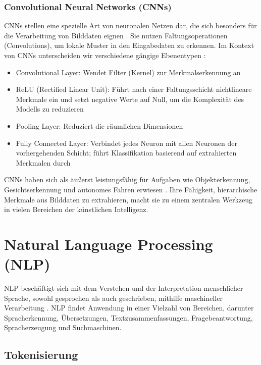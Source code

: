 \subsubsection{Convolutional Neural Networks (CNNs)}
\label{subsubsec:cnn}

\glspl{CNN} stellen eine spezielle Art von neuronalen Netzen dar, die sich besonders für die Verarbeitung von Bilddaten eignen \cite{RebalaGopinath2019AItM}. Sie nutzen Faltungsoperationen (Convolutions), um lokale Muster in den Eingabedaten zu erkennen. Im Kontext von \glspl{CNN} unterscheiden wir verschiedene gängige Ebenentypen \cite{RebalaGopinath2019AItM}:

\begin{itemize}
	\item Convolutional Layer: Wendet Filter (Kernel) zur Merkmalserkennung an
	\item ReLU (Rectified Linear Unit): Führt nach einer Faltungsschicht nichtlineare Merkmale ein und setzt negative Werte auf Null, um die Komplexität des Modells zu reduzieren
	\item Pooling Layer: Reduziert die räumlichen Dimensionen
	\item Fully Connected Layer: Verbindet jedes Neuron mit allen Neuronen der vorhergehenden Schicht; führt Klassifikation basierend auf extrahierten Merkmalen durch
\end{itemize}

CNNs haben sich als äußerst leistungsfähig für Aufgaben wie Objekterkennung, Gesichtserkennung und autonomes Fahren erwiesen \cite{RebalaGopinath2019AItM}. Ihre Fähigkeit, hierarchische Merkmale aus Bilddaten zu extrahieren, macht sie zu einem zentralen Werkzeug in vielen Bereichen der künstlichen Intelligenz.

\section{Natural Language Processing (NLP)}
\label{sec:nlp}

\gls{NLP} beschäftigt sich mit dem Verstehen und der Interpretation menschlicher Sprache, sowohl gesprochen als auch geschrieben, mithilfe maschineller Verarbeitung \cite{RebalaGopinath2019AItM}. \gls{NLP} findet Anwendung in einer Vielzahl von Bereichen, darunter Spracherkennung, Übersetzungen, Textzusammenfassungen, Fragebeantwortung, Spracherzeugung und Suchmaschinen.

\subsection{Tokenisierung}
\label{subsec:tokenisierung}

